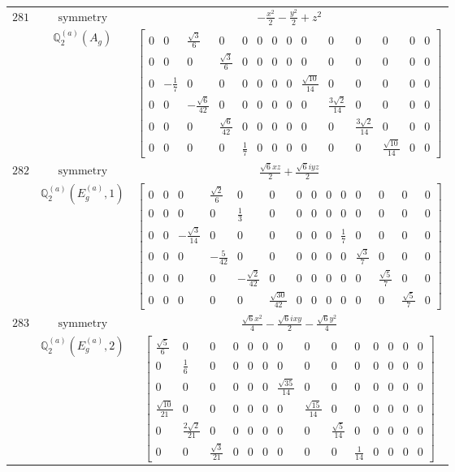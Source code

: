 \documentclass[fleqn,8pt,landscape]{jsarticle}
\begin{document}
\begin{longtable}{ccc}
$ 281 $ & $ \text{symmetry} $ & $ - \frac{x^{2}}{2} - \frac{y^{2}}{2} + z^{2} $ \\
$  $ & $ \mathbb{Q}_{2}^{(a)}(A_{g}) $ & $ \begin{bmatrix} 0 & 0 & \frac{\sqrt{3}}{6} & 0 & 0 & 0 & 0 & 0 & 0 & 0 & 0 & 0 & 0 & 0 \\ 0 & 0 & 0 & \frac{\sqrt{3}}{6} & 0 & 0 & 0 & 0 & 0 & 0 & 0 & 0 & 0 & 0 \\ 0 & - \frac{1}{7} & 0 & 0 & 0 & 0 & 0 & 0 & \frac{\sqrt{10}}{14} & 0 & 0 & 0 & 0 & 0 \\ 0 & 0 & - \frac{\sqrt{6}}{42} & 0 & 0 & 0 & 0 & 0 & 0 & \frac{3 \sqrt{2}}{14} & 0 & 0 & 0 & 0 \\ 0 & 0 & 0 & \frac{\sqrt{6}}{42} & 0 & 0 & 0 & 0 & 0 & 0 & \frac{3 \sqrt{2}}{14} & 0 & 0 & 0 \\ 0 & 0 & 0 & 0 & \frac{1}{7} & 0 & 0 & 0 & 0 & 0 & 0 & \frac{\sqrt{10}}{14} & 0 & 0 \end{bmatrix} $ \\ \hline
$ 282 $ & $ \text{symmetry} $ & $ \frac{\sqrt{6} x z}{2} + \frac{\sqrt{6} i y z}{2} $ \\
$  $ & $ \mathbb{Q}_{2}^{(a)}(E_{g}^{(a)},1) $ & $ \begin{bmatrix} 0 & 0 & 0 & \frac{\sqrt{2}}{6} & 0 & 0 & 0 & 0 & 0 & 0 & 0 & 0 & 0 & 0 \\ 0 & 0 & 0 & 0 & \frac{1}{3} & 0 & 0 & 0 & 0 & 0 & 0 & 0 & 0 & 0 \\ 0 & 0 & - \frac{\sqrt{3}}{14} & 0 & 0 & 0 & 0 & 0 & 0 & \frac{1}{7} & 0 & 0 & 0 & 0 \\ 0 & 0 & 0 & - \frac{5}{42} & 0 & 0 & 0 & 0 & 0 & 0 & \frac{\sqrt{3}}{7} & 0 & 0 & 0 \\ 0 & 0 & 0 & 0 & - \frac{\sqrt{2}}{42} & 0 & 0 & 0 & 0 & 0 & 0 & \frac{\sqrt{5}}{7} & 0 & 0 \\ 0 & 0 & 0 & 0 & 0 & \frac{\sqrt{30}}{42} & 0 & 0 & 0 & 0 & 0 & 0 & \frac{\sqrt{5}}{7} & 0 \end{bmatrix} $ \\ \hline
$ 283 $ & $ \text{symmetry} $ & $ \frac{\sqrt{6} x^{2}}{4} - \frac{\sqrt{6} i x y}{2} - \frac{\sqrt{6} y^{2}}{4} $ \\
$  $ & $ \mathbb{Q}_{2}^{(a)}(E_{g}^{(a)},2) $ & $ \begin{bmatrix} \frac{\sqrt{5}}{6} & 0 & 0 & 0 & 0 & 0 & 0 & 0 & 0 & 0 & 0 & 0 & 0 & 0 \\ 0 & \frac{1}{6} & 0 & 0 & 0 & 0 & 0 & 0 & 0 & 0 & 0 & 0 & 0 & 0 \\ 0 & 0 & 0 & 0 & 0 & 0 & \frac{\sqrt{35}}{14} & 0 & 0 & 0 & 0 & 0 & 0 & 0 \\ \frac{\sqrt{10}}{21} & 0 & 0 & 0 & 0 & 0 & 0 & \frac{\sqrt{15}}{14} & 0 & 0 & 0 & 0 & 0 & 0 \\ 0 & \frac{2 \sqrt{2}}{21} & 0 & 0 & 0 & 0 & 0 & 0 & \frac{\sqrt{5}}{14} & 0 & 0 & 0 & 0 & 0 \\ 0 & 0 & \frac{\sqrt{3}}{21} & 0 & 0 & 0 & 0 & 0 & 0 & \frac{1}{14} & 0 & 0 & 0 & 0 \end{bmatrix} $ \\ \hline

\end{longtable}
\end{document}
